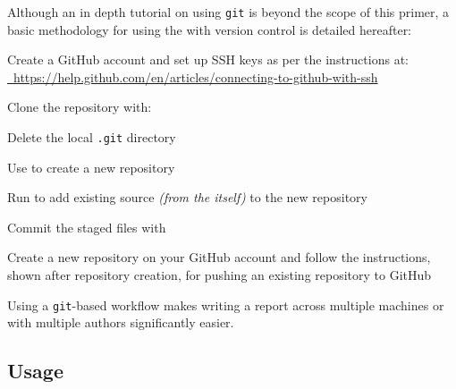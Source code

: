 Although an in depth tutorial on using \texttt{git} is beyond the scope of this primer, a basic methodology for using the \uswdwmspkg{} with version control is detailed hereafter:

\begin{methodology0}
  \item Create a GitHub account and set up SSH keys as per the instructions at:\\
    \href{https://help.github.com/en/articles/connecting-to-github-with-ssh}{\faGithub\ https://help.github.com/en/articles/connecting-to-github-with-ssh}
  \item Clone the \uswdwmspkg{} repository with:\\
  \item Delete the local \texttt{.git} directory
  \item Use  to create a new repository
  \item Run  to add existing source \textit{(from the \uswdwmspkg{} itself)} to the new repository
  \item Commit the staged files with 
  \item Create a new repository on your GitHub account and follow the instructions, shown after repository creation, for pushing an existing repository to GitHub
\end{methodology0}

\noindent Using a \texttt{git}-based workflow makes writing a report across multiple machines or with multiple authors significantly easier.

\pagebreak
\subsection{Usage}

